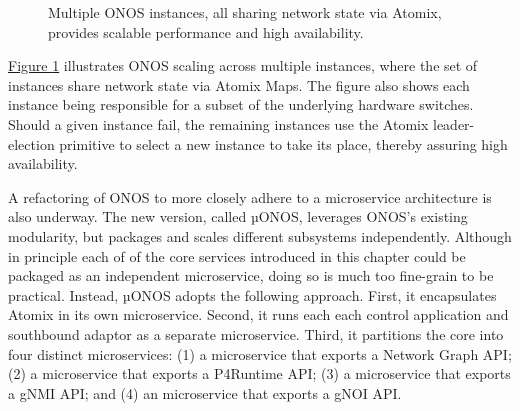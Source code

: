 \documentclass[letterpaper,11pt,english]{sphinxmanual}
\let\sphinxpxdimen\pdfpxdimen\else\newdimen\sphinxpxdimen
\begin{document}
\begin{figure}[htbp]
\centering
\capstart

\noindent\sphinxincludegraphics[width=600\sphinxpxdimen]{{Slide42}.png}
\caption{Multiple ONOS instances, all sharing network state via Atomix,
provides scalable performance and high availability.}\label{\detokenize{onos:id13}}\label{\detokenize{onos:fig-ha}}\end{figure}

\hyperref[\detokenize{onos:fig-ha}]{Figure \ref{\detokenize{onos:fig-ha}}} illustrates ONOS scaling across multiple
instances, where the set of instances share network state via Atomix
Maps. The figure also shows each instance being responsible for a
subset of the underlying hardware switches. Should a given instance
fail, the remaining instances use the Atomix leader-election primitive
to select a new instance to take its place, thereby assuring high
availability.

A refactoring of ONOS to more closely adhere to a microservice
architecture is also underway. The new version, called µONOS,
leverages ONOS’s existing modularity, but packages and scales
different subsystems independently. Although in principle each of of
the core services introduced in this chapter could be packaged as an
independent microservice, doing so is much too fine-grain to be
practical. Instead, µONOS adopts the following approach. First, it
encapsulates Atomix in its own microservice. Second, it runs each each
control application and southbound adaptor as a separate
microservice. Third, it partitions the core into four distinct
microservices: (1) a  microservice that exports a
Network Graph API; (2) a  microservice that
exports a P4Runtime API; (3) a  microservice
that exports a gNMI API; and (4) an 
microservice that exports a gNOI API.
\end{document}

